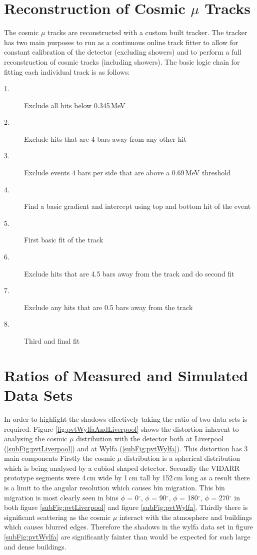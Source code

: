 \documentclass[12pt,a4paper]{article}
\begin{document}
\section{Reconstruction of Cosmic $\mu$ Tracks} \label{sec:ReconstructionOfCosmicMuTracks}
The cosmic $\mu$ tracks are reconstructed with a custom built tracker. The tracker has two main purposes to run as a continuous online track fitter to allow for constant calibration of the detector (excluding showers) and to perform a full reconstruction of cosmic tracks (including showers). The basic logic chain for fitting each individual track is as follows: 
\begin{description}
  \item[1.] Exclude all hits below 0.345\,MeV
  \item[2.] Exclude hits that are 4 bars away from any other hit 
  \item[3.] Exclude events 4 bars per side that are above a 0.69\,MeV threshold
  \item[4.] Find a basic gradient and intercept using top and bottom hit of the event
  \item[5.] First basic fit of the track 
  \item[6.] Exclude hits that are 4.5 bars away from the track and do second fit 
  \item[7.] Exclude any hits that are 0.5 bars away from the track
  \item[8.] Third and final fit 
\end{description}

\section{Ratios of Measured and Simulated Data Sets} \label{sec:RatiosOfMeasuredAndSimulatedDataSets}
In order to highlight the shadows effectively taking the ratio of two data sets is required. Figure \ref{fig:pvtWylfaAndLiverpool} shows the distortion inherent to analysing the cosmic $\mu$ distribution with the detector both at Liverpool (\ref{subFig:pvtLiverpool}) and at Wylfa (\ref{subFig:pvtWylfa}). This distortion has 3 main components Firstly the cosmic $\mu$ distribution is a spherical distribution which is being analysed by a cubiod shaped detector. Secondly the VIDARR prototype segments were 4\,cm wide by 1\,cm tall by 152\,cm long as a result there is a limit to the angular resolution which causes bin migration. This bin migration is most clearly seen in bins $\phi$ = 0$^\circ$, $\phi$ =  90$^\circ$, $\phi$ = 180$^\circ$, $\phi$ = 270$^\circ$ in both figure \ref{subFig:pvtLiverpool} and figure \ref{subFig:pvtWylfa}. Thirdly there is significant scattering as the cosmic $\mu$ interact with the atmosphere and buildings which causes blurred edges. Therefore the shadows in the wylfa data set in figure \ref{subFig:pvtWylfa} are significantly fainter than would be expected for such large and dense buildings.  
\end{document}
